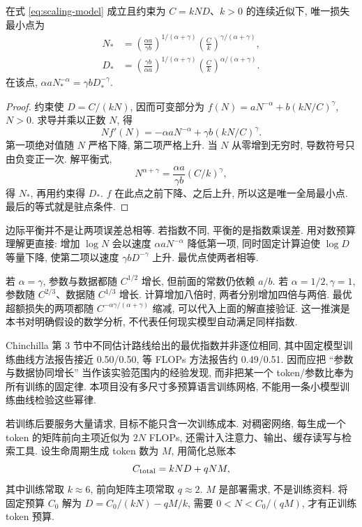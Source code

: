\begin{theorem}\label{thm:compute-optimal}
在式 \eqref{eq:scaling-model} 成立且约束为 $C=kND$、$k>0$ 的连续近似下, 唯一损失最小点为
\begin{align*}
N_*&=\left(\frac{\alpha a}{\gamma b}\right)^{1/(\alpha+\gamma)}
       \left(\frac Ck\right)^{\gamma/(\alpha+\gamma)},\\
D_*&=\left(\frac{\gamma b}{\alpha a}\right)^{1/(\alpha+\gamma)}
       \left(\frac Ck\right)^{\alpha/(\alpha+\gamma)}.
\end{align*}
在该点, $\alpha aN_*^{-\alpha}=\gamma bD_*^{-\gamma}$.
\end{theorem}
\begin{proof}
约束使 $D=C/(kN)$, 因而可变部分为
$f(N)=aN^{-\alpha}+b(kN/C)^\gamma$, $N>0$. 求导并乘以正数 $N$, 得
\[
Nf'(N)=-\alpha aN^{-\alpha}+\gamma b(kN/C)^\gamma.
\]
第一项绝对值随 $N$ 严格下降, 第二项严格上升. 当 $N$ 从零增到无穷时, 导数符号只由负变正一次. 解平衡式,
\[
N^{\alpha+\gamma}=\frac{\alpha a}{\gamma b}(C/k)^\gamma,
\]
得 $N_*$, 再用约束得 $D_*$. $f$ 在此点之前下降、之后上升, 所以这是唯一全局最小点. 最后的等式就是驻点条件.
\end{proof}
边际平衡并不是让两项误差总相等. 若指数不同, 平衡的是指数乘误差. 用对数预算理解更直接: 增加 $\log N$ 会以速度 $\alpha aN^{-\alpha}$ 降低第一项, 同时固定计算迫使 $\log D$ 等量下降, 使第二项以速度 $\gamma bD^{-\gamma}$ 上升. 最优点使两者相等.

若 $\alpha=\gamma$, 参数与数据都随 $C^{1/2}$ 增长, 但前面的常数仍依赖 $a/b$. 若 $\alpha=1/2,\gamma=1$, 参数随 $C^{2/3}$、数据随 $C^{1/3}$ 增长. 计算增加八倍时, 两者分别增加四倍与两倍. 最优超额损失的两项都随 $C^{-\alpha\gamma/(\alpha+\gamma)}$ 缩减, 可以代入上面的解直接验证. 这一推演是本书对明确假设的数学分析, 不代表任何现实模型自动满足同样指数.

Chinchilla 第 3 节中不同估计路线给出的最优指数并非逐位相同, 其中固定模型训练曲线方法报告接近 0.50/0.50, 等 FLOPs 方法报告约 0.49/0.51\cite{chinchilla}. 因而应把 ``参数与数据协同增长'' 当作该实验范围内的经验发现, 而非把某一个 token/参数比奉为所有训练的固定律. 本项目没有多尺寸多预算语言训练网格, 不能用一条小模型训练曲线检验这些幂律.

\label{sec:progress-deploy}
若训练后要服务大量请求, 目标不能只含一次训练成本. 对稠密网络, 每生成一个 token 的矩阵前向主项近似为 $2N$ FLOPs, 还需计入注意力、输出、缓存读写与检索工具. 设生命周期生成 token 数为 $M$, 用简化总账本
\[
C_{\rm total}=kND+qNM,
\]
其中训练常取 $k\approx6$, 前向矩阵主项常取 $q\approx2$. $M$ 是部署需求, 不是训练资料. 将固定预算 $C_0$ 解为 $D=C_0/(kN)-qM/k$, 需要 $0<N<C_0/(qM)$, 才有正训练 token 预算.

